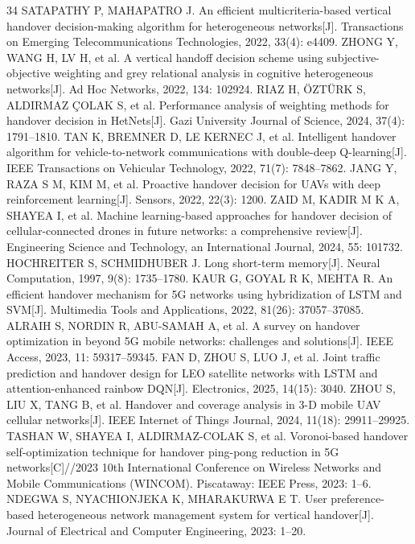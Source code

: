 \documentclass[10pt,a4paper]{ctexart}
\begin{document}
{\begin{thebibliography}{34}
 SATAPATHY P, MAHAPATRO J. An efficient multicriteria-based vertical handover decision-making algorithm for heterogeneous networks[J]. Transactions on Emerging Telecommunications Technologies, 2022, 33(4): e4409.
 ZHONG Y, WANG H, LV H, et al. A vertical handoff decision scheme using subjective-objective weighting and grey relational analysis in cognitive heterogeneous networks[J]. Ad Hoc Networks, 2022, 134: 102924.
 RIAZ H, ÖZTÜRK S, ALDIRMAZ ÇOLAK S, et al. Performance analysis of weighting methods for handover decision in HetNets[J]. Gazi University Journal of Science, 2024, 37(4): 1791--1810.
 TAN K, BREMNER D, LE KERNEC J, et al. Intelligent handover algorithm for vehicle-to-network communications with double-deep Q-learning[J]. IEEE Transactions on Vehicular Technology, 2022, 71(7): 7848--7862.
 JANG Y, RAZA S M, KIM M, et al. Proactive handover decision for UAVs with deep reinforcement learning[J]. Sensors, 2022, 22(3): 1200.
 ZAID M, KADIR M K A, SHAYEA I, et al. Machine learning-based approaches for handover decision of cellular-connected drones in future networks: a comprehensive review[J]. Engineering Science and Technology, an International Journal, 2024, 55: 101732.
 HOCHREITER S, SCHMIDHUBER J. Long short-term memory[J]. Neural Computation, 1997, 9(8): 1735--1780.
 KAUR G, GOYAL R K, MEHTA R. An efficient handover mechanism for 5G networks using hybridization of LSTM and SVM[J]. Multimedia Tools and Applications, 2022, 81(26): 37057--37085.
 ALRAIH S, NORDIN R, ABU-SAMAH A, et al. A survey on handover optimization in beyond 5G mobile networks: challenges and solutions[J]. IEEE Access, 2023, 11: 59317--59345.
 FAN D, ZHOU S, LUO J, et al. Joint traffic prediction and handover design for LEO satellite networks with LSTM and attention-enhanced rainbow DQN[J]. Electronics, 2025, 14(15): 3040.
 ZHOU S, LIU X, TANG B, et al. Handover and coverage analysis in 3-D mobile UAV cellular networks[J]. IEEE Internet of Things Journal, 2024, 11(18): 29911--29925.
 TASHAN W, SHAYEA I, ALDIRMAZ-COLAK S, et al. Voronoi-based handover self-optimization technique for handover ping-pong reduction in 5G networks[C]//2023 10th International Conference on Wireless Networks and Mobile Communications (WINCOM). Piscataway: IEEE Press, 2023: 1--6.
 NDEGWA S, NYACHIONJEKA K, MHARAKURWA E T. User preference-based heterogeneous network management system for vertical handover[J]. Journal of Electrical and Computer Engineering, 2023: 1--20.

\end{thebibliography}}
\end{document}
